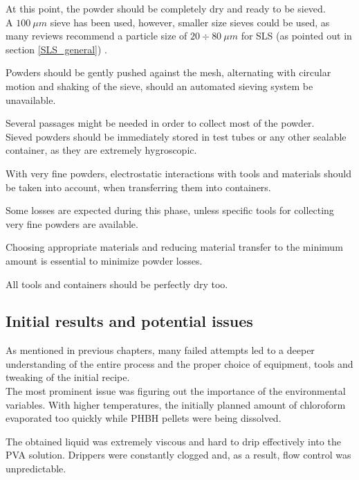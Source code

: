 \documentclass{article}
\begin{document}
        At this point, the powder should be completely dry and ready to be sieved. \\ 

        A $100 \ \mu m$ sieve has been used, however, smaller size sieves could be used, as many reviews recommend a particle 
        size of $20 \div 80 \ \mu m$ for SLS (as pointed out in section \ref{SLS_general}) \autocites{Padovano_SLS_Review}. 
        
        Powders should be gently pushed against the mesh, alternating with circular motion and shaking of the sieve, should 
        an automated sieving system be unavailable. 

        Several passages might be needed in order to collect most of the powder. \\ 

        Sieved powders should be immediately stored in test tubes or any other sealable container, as they are extremely hygroscopic. 

        With very fine powders, electrostatic interactions with tools and materials should be taken into account, when transferring 
        them into containers. 

        Some losses are expected during this phase, unless specific tools for collecting very fine powders are available. 

        Choosing appropriate materials and reducing material transfer to the minimum amount is essential to minimize 
        powder losses. 

        All tools and containers should be perfectly dry too. 



        \subsection{Initial results and potential issues\label{initial_failures}}

        As mentioned in previous chapters, many failed attempts led to a deeper understanding of the entire process 
        and the proper choice of equipment, tools and tweaking of the initial recipe. \\ 

        The most prominent issue was figuring out the importance of the environmental variables. With higher temperatures, the initially planned amount of chloroform evaporated too 
        quickly while PHBH pellets were being dissolved. 

        The obtained liquid was extremely viscous and hard to drip effectively into the PVA solution. Drippers were constantly clogged
        and, as a result, flow control was unpredictable. 
        
\end{document}
